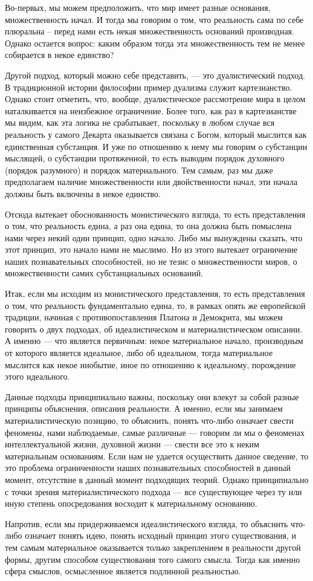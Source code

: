 \documentclass[oneside,final,14pt]{extreport}
\begin{document}
Во-первых, мы можем предположить, что мир имеет разные основания, множественность начал. И тогда мы говорим о том, что реальность сама по себе плюральна – перед нами есть некая множественность оснований производная. Однако остается вопрос: каким образом тогда эта множественность тем не менее собирается в некое единство?

Другой подход, который можно себе представить, — это дуалистический подход. В традиционной истории философии пример дуализма служит картезианство. Однако стоит отметить, что, вообще, дуалистическое рассмотрение мира в целом наталкивается на неизбежное ограничение. Более того, как раз в картезианстве мы видим, как эта логика не срабатывает, поскольку в любом случае вся реальность у самого Декарта оказывается связана с Богом, который мыслится как единственная субстанция. И уже по отношению к нему мы говорим о субстанции мыслящей, о субстанции протяженной, то есть выводим порядок духовного (порядок разумного) и порядок материального. Тем самым, раз мы даже предполагаем наличие множественности или двойственности начал, эти начала должны быть включены в некое единство.

Отсюда вытекает обоснованность монистического взгляда, то есть представления о том, что реальность едина, а раз она едина, то она должна быть помыслена нами через некий один принцип, одно начало. Либо мы вынуждены сказать, что этот принцип, это начало нами не мыслимо. Но из этого вытекает ограничение наших познавательных способностей, но не тезис о множественности миров, о множественности самих субстанциальных оснований.

Итак, если мы исходим из монистического представления, то есть представления о том, что реальность фундаментально едина, то, в рамках опять же европейской традиции, начиная с противопоставления Платона и Демокрита, мы можем говорить о двух подходах, об идеалистическом и материалистическом описании. А именно — что является первичным: некое материальное начало, производным от которого является идеальное, либо об идеальном, тогда материальное мыслится как некое инобытие, иное по отношению к идеальному, порождение этого идеального.

Данные подходы принципиально важны, поскольку они влекут за собой разные принципы объяснения, описания реальности. А именно, если мы занимаем материалистическую позицию, то объяснить, понять что-либо означает свести феномены, нами наблюдаемые, самые различные — говорим ли мы о феноменах интеллектуальной жизни, духовной жизни — свести все это к неким материальным основаниям. Если нам не удается осуществить данное сведение, то это проблема ограниченности наших познавательных способностей в данный момент, отсутствие в данный момент подходящих теорий. Однако принципиально с точки зрения материалистического подхода — все существующее через ту или иную степень опосредования восходит к материальному основанию.

Напротив, если мы придерживаемся идеалистического взгляда, то объяснить что-либо означает понять идею, понять исходный принцип этого существования, и тем самым материальное оказывается только закреплением в реальности другой формы, другим способом существования того самого смысла. Тогда как именно сфера смыслов, осмысленное является подлинной реальностью.
\end{document}
